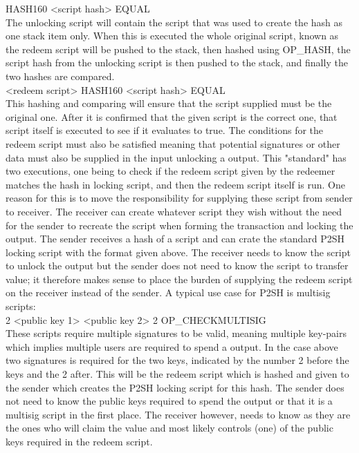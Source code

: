 HASH160 <script hash> EQUAL
\\

The unlocking script will contain the script that was used to create the hash as one stack item only. When this is executed the whole original script, known as the redeem script will be pushed to the stack, then hashed using OP\_HASH, the script hash from the unlocking script is then pushed to the stack, and finally the two hashes are compared.
\\

<redeem script> HASH160 <script hash> EQUAL
\\

This hashing and comparing will ensure that the script supplied must be the original one. After it is confirmed that the given script is the correct one, that script itself is executed to see if it evaluates to true. The conditions for the redeem script must also be satisfied meaning that potential signatures or other data must also be supplied in the input unlocking a output. This "standard" has two executions, one being to check if the redeem script given by the redeemer matches the hash in locking script, and then the redeem script itself is run.
One reason for this is to move the responsibility for supplying these script from sender to receiver. The receiver can create whatever script they wish without the need for the sender to recreate the script when forming the transaction and locking the output. The sender receives a hash of a script and can crate the standard P2SH locking script with the format given above. The receiver needs to know the script to unlock the output but the sender does not need to know the script to transfer value; it therefore makes sense to place the burden of supplying the redeem script on the receiver instead of the sender. A typical use case for P2SH is multisig scripts: 
\\

2 <public key 1> <public key 2> 2 OP\_CHECKMULTISIG
\\

These scripts require multiple signatures to be valid, meaning multiple key-pairs which implies multiple users are required to spend a output.
In the case above two signatures is required for the two keys, indicated by the number 2 before the keys and the 2 after.
This will be the redeem script which is hashed and given to the sender which creates the P2SH locking script for this hash.
The sender does not need to know the public keys required to spend the output or that it is a multisig script in the first place. The receiver however, needs to know as they are the ones who will claim the value and most likely controls (one) of the public keys required in the redeem script.
\\


